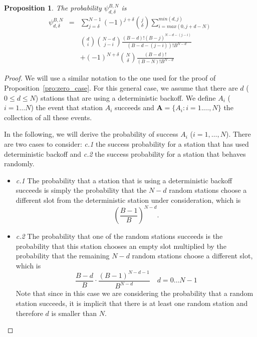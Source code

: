 \documentclass[journal]{IEEEtran}
\newtheorem{proposition}{Proposition}
\begin{document}
\begin{proposition}
\label{pro:general_case}
The probability $\psi^{B,N}_{d,\delta}$ is 
\begin{eqnarray}
\psi^{B,N}_{d,\delta} & {}={} & \sum_{j=\delta}^{N-1}  (-1)^{j+\delta} \binom{j}{\delta}  
\sum_{i=max(0,j+d-N)}^{min(d,j)} \nonumber\\
& & \binom{d}{i} \binom{N-d}{j-i} 
\frac{(B-d)! (B-j)^{N-d-(j-i)}}{(B-d-(j-i))! B^{N-d}} 
\nonumber\\
& & + (-1)^{N+\delta} \binom{N}{\delta} \frac{(B-d)!}{(B-N)!B^{N-d}}
\label{eq:psi}
\end{eqnarray}
\end{proposition}

\begin{proof}
We will use a similar notation to the one used for the proof of Proposition~\ref{pro:zero_case}.
For this general case, we assume that there are $d$ ($0 \leq d \leq N$) stations that are using a deterministic backoff.
We define $A_i$ ($i=1\dots N$) the event that station $A_i$ succeeds and $\mathbf{A}=\{A_i:i=1. \dots, N \}$ the collection of all these events.

In the following, we will derive the probability of success $A_i$ ($i=1,\dots ,N$). There are two cases to consider: \emph{c.1} the success probability for a station that has used deterministic backoff and \emph{c.2} the success probability for a station that behaves randomly.

\begin{itemize}
\item \emph{c.1} The probability that a station that is using a deterministic backoff succeeds is simply the probability that the $N-d$ random stations choose a different slot from the deterministic station under consideration, which is
\begin{equation}
\label{eq:success_deterministic}
\left( \frac{B-1}{B} \right)^{N-d}.
\end{equation}
\item \emph{c.2} The probability that one of the random stations succeeds is the probability that this station chooses an empty slot multiplied by the probability that the remaining $N-d$ random stations choose a different slot, which is
\begin{equation}
\label{eq:success_random}
\frac{B-d}{B} \cdot \frac{(B-1)^{N-d-1}}{B^{N-d}}
\quad
d=0 \dots N-1
\end{equation}
Note that since in this case we are considering the probability that a random station succeeds, it is implicit that there is at least one random station and therefore $d$ is smaller than $N$.
\end{itemize}


\end{proof}
\end{document}
